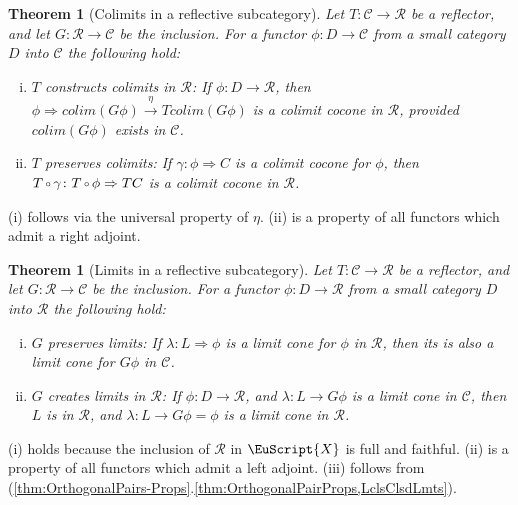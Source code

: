 \documentclass [12pt,oneside]{book}%
\makeatletter
\theoremstyle{captionstyle}  %
\newtheorem{theorem}[subsection]{Theorem}
\renewenvironment{proof}[1][\proofname]{\vspace{-2ex}\par       %
	\pushQED{\qed}%
	\normalfont \topsep6\p@\@plus6\p@\relax
	\trivlist
	\item[\hskip\labelsep
	            \color{proofcaption}\bfseries                %
	            #1\@addpunct{\quad}]\ignorespaces
}{%
	\popQED\endtrivlist\@endpefalse
}
\newcommand{\XRA}[1]{\xrightarrow{\ #1\ }}
\newcommand{\from}{\colon}				%
\newcommand{\Comp}{\raisebox{0.1ex}{\ensuremath{\,\scriptstyle{\circ}}\,}}
\newcommand{\AdjUnit}{\eta}										     %
\newcommand{\SACtgry}[1]{\EuScript{#1}}			%
\newcommand{\CoLimOf}[1]{\textit{colim}\left(#1\right)}		%
\makeatother
\begin{document}
\begin{theorem}[Colimits in a reflective subcategory]
    \label{thm:ReflectiveSubCat-Colimits}
    Let $T\from \mathcal{C}\to \mathcal{R}$ be a reflector, and let $G\from \mathcal{R}\to \mathcal{C}$ be the inclusion. For a functor $\phi\from D\to \mathcal{C}$ from a small category $D$ into $\mathcal{C}$ the following hold:
    \begin{enumerate}[(i)]
        \item $T$ \emph{constructs colimits in $\mathcal{R}$}: If $\phi\from D\to \mathcal{R}$, then $\phi\Rightarrow \CoLimOf{G\phi} \XRA{\AdjUnit}  T\CoLimOf{G\phi}$ is a colimit cocone in $\mathcal{R}$, provided $\CoLimOf{G\phi}$ exists in $\mathcal{C}$.
        \item $T$ \emph{preserves colimits}: If $\gamma\from \phi\Rightarrow C$ is a colimit cocone for $\phi$, then $T\Comp \gamma \from T\Comp \phi \Rightarrow TC$ is a colimit cocone in $\mathcal{R}$.
    \end{enumerate}
\end{theorem}
\begin{proof}
    (i) follows via the universal property of $\AdjUnit$. (ii) is a property of all functors which admit a right adjoint.
\end{proof}

\begin{theorem}[Limits in a reflective subcategory]
    \label{thm:ReflectiveSubCat-Limits}
    Let $T\from \mathcal{C}\to \mathcal{R}$ be a reflector, and let $G\from \mathcal{R}\to \mathcal{C}$ be the inclusion. For a functor $\phi\from D\to \mathcal{R}$ from a small category $D$ into $\mathcal{R}$ the following hold:
    \begin{enumerate}[(i)]
        \item \emph{$G$ preserves limits}: If $\lambda\from L\Rightarrow \phi$ is a limit cone for $\phi$ in $\mathcal{R}$, then its is also a limit cone for $G\phi$ in $\mathcal{C}$.
        \item $G$ \emph{creates limits in $\mathcal{R}$}: If $\phi\from D\to \mathcal{R}$, and $\lambda\from L\to G\phi$ is a limit cone in $\mathcal{C}$, then $L$ is in $\mathcal{R}$, and $\lambda\from L\to G\phi=\phi$ is a limit cone in $\mathcal{R}$.
    \end{enumerate}
\end{theorem}
\begin{proof}
    (i) holds because the inclusion of $\mathcal{R}$ in $\SACtgry{X}$ is full and faithful.
    (ii) is a property of all functors which admit a left adjoint. (iii) follows from (\ref{thm:OrthogonalPairs-Props}.\ref{thm:OrthogonalPairProps,LclsClsdLmts}).
\end{proof}
\end{document}
